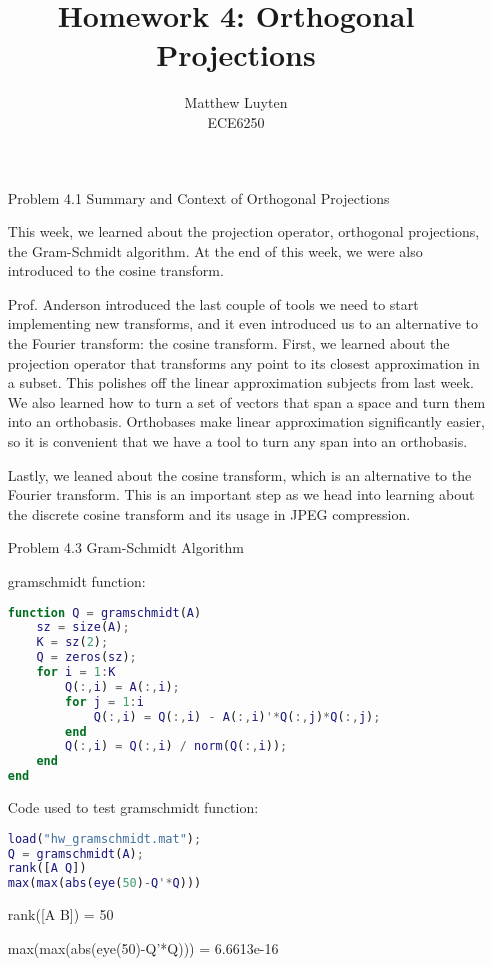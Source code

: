 \documentclass[12pt]{article}
\begin{document}
 
\title{Homework 4: Orthogonal Projections}
\author{Matthew Luyten\\ %
ECE6250}

\maketitle

\begin{enumerate}
\item[Problem 4.1] Summary and Context of Orthogonal Projections

This week, we learned about the projection operator, orthogonal projections, the Gram-Schmidt algorithm. At 
the end of this week, we were also introduced to the cosine transform. 

Prof. Anderson introduced the last couple of tools we need to start implementing new transforms, and it even introduced 
us to an alternative to the
Fourier transform: the cosine transform. First, we learned about the projection operator that transforms any
point to its closest approximation in a subset. This polishes off the linear approximation subjects from last week.
We also learned how to turn a set of vectors that span a space and turn them into an orthobasis. Orthobases make 
linear approximation significantly easier, so it is convenient that we have a tool to turn any span into an 
orthobasis.

Lastly, we leaned about the cosine transform, which is an alternative to the Fourier transform. This is an important 
step as we head into learning about the discrete cosine transform and its usage in JPEG compression.

\newpage

\item[Problem 4.3] Gram-Schmidt Algorithm

gramschmidt function:
\begin{lstlisting}[language=matlab]
function Q = gramschmidt(A)
    sz = size(A);
    K = sz(2);
    Q = zeros(sz);
    for i = 1:K
        Q(:,i) = A(:,i);
        for j = 1:i
            Q(:,i) = Q(:,i) - A(:,i)'*Q(:,j)*Q(:,j);
        end
        Q(:,i) = Q(:,i) / norm(Q(:,i));
    end
end
\end{lstlisting}

Code used to test gramschmidt function:
\begin{lstlisting}[language=matlab]
load("hw_gramschmidt.mat");
Q = gramschmidt(A);
rank([A Q])
max(max(abs(eye(50)-Q'*Q)))
\end{lstlisting}

\begin{framed}
    rank([A B]) = 50

    max(max(abs(eye(50)-Q'*Q))) = 6.6613e-16
\end{framed}

\end{enumerate}
\end{document}
